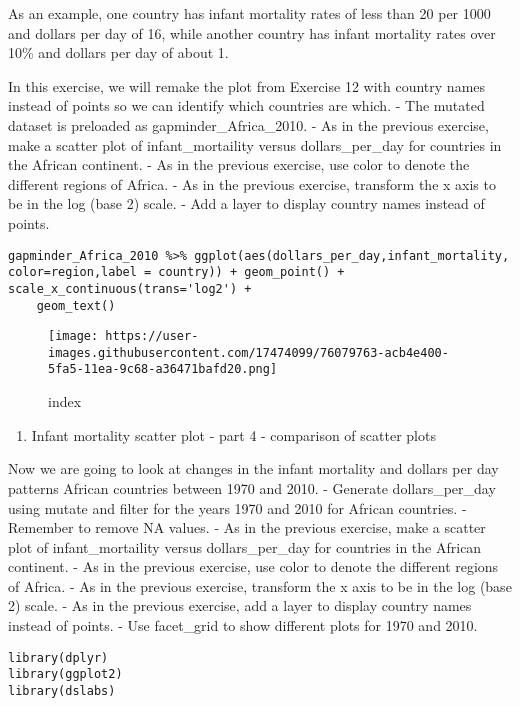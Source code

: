 \documentclass[]{article}
\providecommand{\tightlist}{%
  \setlength{\itemsep}{0pt}\setlength{\parskip}{0pt}}
\begin{document}
As an example, one country has infant mortality rates of less than 20
per 1000 and dollars per day of 16, while another country has infant
mortality rates over 10\% and dollars per day of about 1.

In this exercise, we will remake the plot from Exercise 12 with country
names instead of points so we can identify which countries are which. -
The mutated dataset is preloaded as gapminder\_Africa\_2010. - As in the
previous exercise, make a scatter plot of infant\_mortaility versus
dollars\_per\_day for countries in the African continent. - As in the
previous exercise, use color to denote the different regions of Africa.
- As in the previous exercise, transform the x axis to be in the log
(base 2) scale. - Add a layer to display country names instead of
points.

\begin{verbatim}
gapminder_Africa_2010 %>% ggplot(aes(dollars_per_day,infant_mortality, color=region,label = country)) + geom_point() + scale_x_continuous(trans='log2') +
    geom_text()
\end{verbatim}

\begin{figure}
\centering
\texttt{[image: https://user-images.githubusercontent.com/17474099/76079763-acb4e400-5fa5-11ea-9c68-a36471bafd20.png]}
\caption{index}
\end{figure}

\begin{enumerate}
\def\labelenumi{\arabic{enumi}.}
\setcounter{enumi}{13}
\tightlist
\item
  Infant mortality scatter plot - part 4 - comparison of scatter plots
\end{enumerate}

Now we are going to look at changes in the infant mortality and dollars
per day patterns African countries between 1970 and 2010. - Generate
dollars\_per\_day using mutate and filter for the years 1970 and 2010
for African countries. - Remember to remove NA values. - As in the
previous exercise, make a scatter plot of infant\_mortaility versus
dollars\_per\_day for countries in the African continent. - As in the
previous exercise, use color to denote the different regions of Africa.
- As in the previous exercise, transform the x axis to be in the log
(base 2) scale. - As in the previous exercise, add a layer to display
country names instead of points. - Use facet\_grid to show different
plots for 1970 and 2010.

\begin{verbatim}
library(dplyr)
library(ggplot2)
library(dslabs)
\end{verbatim}
\end{document}
